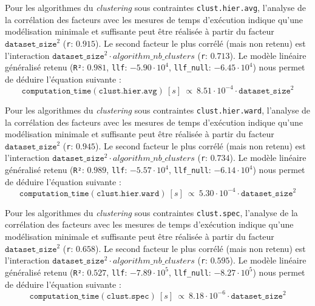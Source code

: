 			Pour les algorithmes du \textit{clustering} sous contraintes \texttt{clust.hier.avg}, l'analyse de la corrélation des facteurs avec les mesures de temps d'exécution indique qu'une modélisation minimale et suffisante peut être réalisée à partir du facteur $\texttt{dataset\_size}^{2}$ (\texttt{r}: $0.915$).
			Le second facteur le plus corrélé (mais non retenu) est l'interaction $\texttt{dataset\_size}^{2} \cdot algorithm\_nb\_clusters$ (\texttt{r}: $0.713$).
			Le modèle linéaire généralisé retenu (\texttt{R²}: $0.981$, \texttt{llf}: $-5.90 \cdot 10^{4}$, \texttt{llf\_null}: $-6.45 \cdot 10^{4}$) nous permet de déduire l'équation suivante :
			\begin{equation}
				\texttt{computation\_time}(\texttt{clust.hier.avg})~[s]~
				\propto~8.51 \cdot 10^{-4} \cdot \texttt{dataset\_size}^{2}
			\end{equation}

			Pour les algorithmes du \textit{clustering} sous contraintes \texttt{clust.hier.ward}, l'analyse de la corrélation des facteurs avec les mesures de temps d'exécution indique qu'une modélisation minimale et suffisante peut être réalisée à partir du facteur $\texttt{dataset\_size}^{2}$ (\texttt{r}: $0.945$).
			Le second facteur le plus corrélé (mais non retenu) est l'interaction $\texttt{dataset\_size}^{2} \cdot algorithm\_nb\_clusters$ (\texttt{r}: $0.734$).
			Le modèle linéaire généralisé retenu (\texttt{R²}: $0.989$, \texttt{llf}: $-5.57 \cdot 10^{4}$, \texttt{llf\_null}: $-6.14 \cdot 10^{4}$) nous permet de déduire l'équation suivante :
			\begin{equation}
				\texttt{computation\_time}(\texttt{clust.hier.ward})~[s]~
				\propto~5.30 \cdot 10^{-4} \cdot \texttt{dataset\_size}^{2}
			\end{equation}
			
			Pour les algorithmes du \textit{clustering} sous contraintes \texttt{clust.spec}, l'analyse de la corrélation des facteurs avec les mesures de temps d'exécution indique qu'une modélisation minimale et suffisante peut être réalisée à partir du facteur $\texttt{dataset\_size}^{2}$ (\texttt{r}: $0.658$).
			Le second facteur le plus corrélé (mais non retenu) est l'interaction $\texttt{dataset\_size}^{2} \cdot algorithm\_nb\_clusters$ (\texttt{r}: $0.595$).
			Le modèle linéaire généralisé retenu (\texttt{R²}: $0.527$, \texttt{llf}: $-7.89 \cdot 10^{5}$, \texttt{llf\_null}: $-8.27 \cdot 10^{5}$) nous permet de déduire l'équation suivante :
			\begin{equation}
				\texttt{computation\_time}(\texttt{clust.spec})~[s]~
				\propto~8.18 \cdot 10^{-6} \cdot \texttt{dataset\_size}^{2}
			\end{equation}
			
